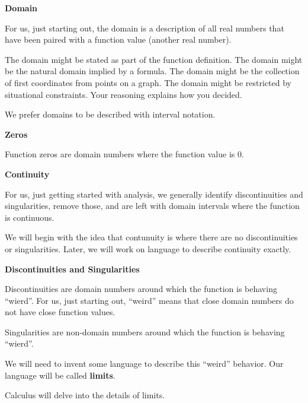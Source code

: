 \documentclass{ximera}
\begin{document}
\begin{explanation}  \textbf{\textcolor{red!75!green}{Domain}} 

For us, just starting out, the domain is a description of all real numbers that have been paired with a function value (another real number). 


The domain might be stated as part of the function definition. The domain might be the natural domain implied by a formula.  The domain might be the collection of first coordinates from points on a graph.  The domain might be restricted by situational constraints. Your reasoning explains how you decided. 


We prefer domains to be described with interval notation.

\end{explanation}











\begin{explanation}  \textbf{\textcolor{red!75!green}{Zeros}} 

Function zeros are domain numbers where the function value is $0$.

\end{explanation}















\begin{explanation}  \textbf{\textcolor{red!75!green}{Continuity}} 

For us, just getting started with analysis, we generally identify discontinuities and singularities, remove those, and are left with domain intervals where the function is continuous. 


We will begin with the idea that contunuity is where there are no discontinuities or singularities.  Later, we will work on language to describe continuity exactly.





\textbf{\textcolor{red!75!green}{Discontinuities and Singularities}} 

Discontinuities are domain numbers around which the function is behaving ``wierd''. For us, just starting out, ``weird'' means that close domain numbers do not have close function values.   




Singularities are non-domain numbers around which the function is behaving ``wierd''.   


We will need to invent some language to describe this ``weird'' behavior.  Our language will be called \textbf{limits}.


Calculus will delve into the details of limits.


\end{explanation}
\end{document}
